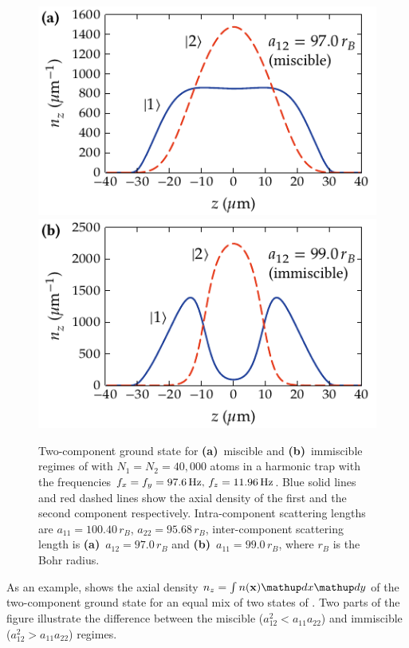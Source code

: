 \begin{figure}
\centerline{%
\includegraphics{figures_generated/mean_field/two_comp_gs_miscible.pdf}%
\includegraphics{figures_generated/mean_field/two_comp_gs_immiscible.pdf}}

\caption{
Two-component ground state for \textbf{(a)}~miscible and \textbf{(b)}~immiscible regimes of \Rb{}  with $N_1 = N_2 = 40,000$ atoms in a  harmonic trap with the frequencies $f_x = f_y = 97.6\mbox{\ensuremath{\,\mathrm{Hz}}},\,f_z = 11.96\mbox{\ensuremath{\,\mathrm{Hz}}}$.
Blue solid lines and red dashed lines show the axial density of the first and the second component respectively.
Intra-component scattering lengths are $a_{11} = 100.40\,r_B$, $a_{22} = 95.68\,r_B$, inter-component scattering length is \textbf{(a)}~$a_{12} = 97.0\,r_B$ and \textbf{(b)}~$a_{11} = 99.0\,r_B$, where $r_B$ is the Bohr radius.}%
\label{fig:bec-noise:mean-field:two-comp-gs}
\end{figure}

As an example,  shows the axial density $n_z = \int n(\xvec) \upd x \upd y$ of the two-component ground state for an equal mix of two states of \Rb{} .
Two parts of the figure illustrate the difference between the miscible ($a_{12}^2 < a_{11} a_{22}$) and immiscible ($a_{12}^2 > a_{11} a_{22}$) regimes.


